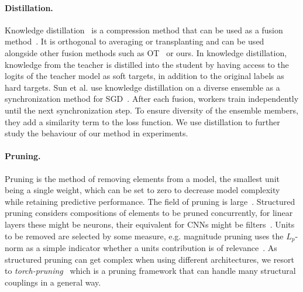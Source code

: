 

\paragraph{Distillation.}
Knowledge distillation~\cite{hinton2015distilling} is a compression method that can be used as a fusion method~\cite{DBLP:journals/corr/abs-2011-07449, DBLP:journals/corr/abs-1812-02425, DBLP:journals/corr/abs-2012-09816}. It is orthogonal to averaging or transplanting and can be used alongside other fusion methods such as OT~\cite{singh2023model} or ours. In knowledge distillation, knowledge from the teacher is distilled into the student by having access to the logits of the teacher model as soft targets, in addition to the original labels as hard targets. Sun et al. use knowledge distillation on a diverse ensemble as a synchronization method for SGD~\cite{sun2017ensemblecompression}. After each fusion, workers train independently until the next synchronization step. To ensure diversity of the ensemble members, they add a similarity term to the loss function. We use distillation to further study the behaviour of our method in experiments.

\paragraph{Pruning.}
Pruning is the method of removing elements from a model, the smallest unit being a single weight, which can be set to zero to decrease model complexity while retaining predictive performance. The field of pruning is large~\cite{mishra2020survey}. Structured pruning considers compositions of elements to be pruned concurrently, for linear layers these might be neurons, their equivalent for CNNs might be filters~\cite{10.1145/3005348}. Units to be removed are selected by some measure, e.g. magnitude pruning uses the $L_p$-norm as a simple indicator whether a units contribution is of relevance~\cite{248452}. As structured pruning can get complex when using different architectures, we resort to \emph{torch-pruning}~\cite{fang2023depgraph} which is a pruning framework that can handle many structural couplings in a general way.


